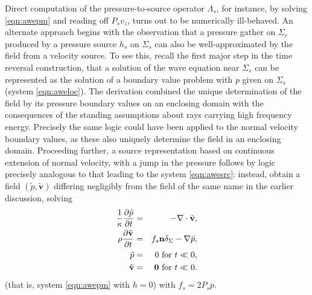 \documentclass[12pt]{geophysics}
\newcommand{\bv}{\mathbf{v}}
\begin{document}
Direct computation of the pressure-to-source operator $\Lambda_s$, for instance, by solving
\ref{eqn:awepm} and reading off $P_sv_{z}$, turns out to be
numerically ill-behaved. An alternate approach begins with the
observation that a pressure gather on $\Sigma_r$ produced by a
pressure source $h_s$ on $\Sigma_s$ can also be well-approximated by
the field from a velocity source. To see this, recall the first major
step in the time reversal construction, that a solution of the wave
equation near $\Sigma_s$ can be represented as the solution of a
boundary value problem with $p$ given on $\Sigma_s$ (system
\ref{eqn:aweloc}). The derivation combined the unique determination of
the field by its pressure boundary values on an enclosing domain with
the consequences of the standing assumptions about rays carrying high
frequency energy. Precisely the same logic could have been applied to
the normal velocity boundary values, as these also uniquely determine
the field in an enclosing domain. Proceeding further, a source
representation based on continuous extension of normal velocity, with
a jump in the pressure follows by logic precisely analogous to that
leading to the system \ref{eqn:awesrc}: instead, obtain a field
$(\tilde{p},\tilde{\bv})$ differing negligibly from the field of the
same name in the earlier discussion, solving 
\begin{eqnarray}
\label{eqn:awesrcvzmod}
  \frac{1}{\kappa}\frac{\partial\tilde{p}}{\partial t} & = & 
                                                      - \nabla \cdot \tilde{\bv}, \nonumber \\
  \rho\frac{\partial \tilde{\bv}}{\partial t} & = & f_s {\bf n}\delta_{\Sigma}- \nabla \tilde{p}, \nonumber \\
  \tilde{p} & = & 0 \mbox{ for }  t \ll 0, \nonumber \\
  \tilde{\bv} & = & {\bf 0} \mbox{ for }  t \ll  0.       
\end{eqnarray}
(that is, system \ref{eqn:awepm} with $h=0$) with $f_s = 2P_sp$.
\end{document}

